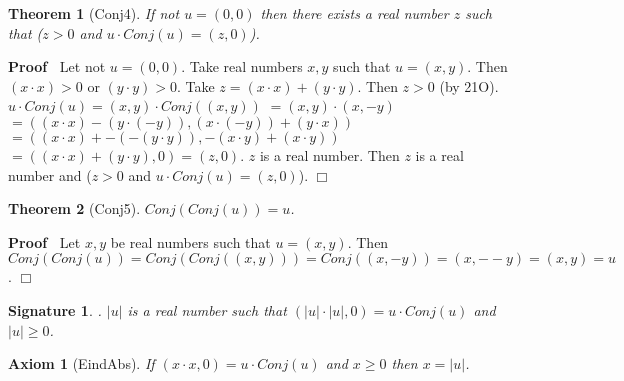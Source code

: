 \documentclass{article}
\newenvironment{forthel}{\begin{leftbar}}{\end{leftbar}}
\newenvironment{proof}{\noindent\textbf{Proof\ }}{\hspace*{\fill}$\Box$\medskip}
\newtheorem{axiom}{Axiom}
\newtheorem{theorem}{Theorem}
\newtheorem{signature}{Signature}
\newcommand{\cmul}{\cdot}
\begin{document}
\begin{forthel}
\begin{theorem}[Conj4] If not $u = (0,0)$ then there exists a real number $z$ such that ($z > 0$ and $u  \cmul  Conj(u) = (z,0)$).
\end{theorem}\begin{proof}
	Let not $u = (0,0)$.\newline
Take real numbers $x,y$ such that $u = (x,y)$.\newline
Then $(x \cdot x) >  0$ or $(y \cdot y) > 0$. Take $z = (x \cdot x) + (y \cdot y)$. \newline
Then $z  >  0$ (by 21O).\newline
$u \cmul Conj(u) = (x,y) \cmul Conj((x,y)) $\newline
$= (x,y) \cmul (x,-y)$ \newline
$= ((x \cdot x) - (y \cdot (-y)) , (x \cdot (-y)) + (y \cdot x)) $\newline
$= ((x \cdot x) + -(-(y \cdot y)) , -(x \cdot y) + (x \cdot y)) $\newline
$= ((x \cdot x) + (y \cdot y), 0) = (z,0)$.\newline
$z$ is a real number.\newline
Then $z$ is a real number and ($z > 0$ and $u \cmul Conj(u) = (z,0)$).\newline
\end{proof}

\begin{theorem}[Conj5] $Conj(Conj(u)) = u$.
\end{theorem}\begin{proof}
 	Let $x,y$ be real numbers such that $u = (x,y)$.\newline
Then $Conj(Conj(u)) = Conj(Conj((x,y))) = Conj((x,-y)) = (x,--y) = (x,y) = u$. \end{proof}

\begin{signature}. $|u|$ is a real number such that $(|u| \cdot |u|,0) = u \cmul Conj(u)$ and $|u|  \geq  0$. \end{signature}
\begin{axiom}[EindAbs] If $(x \cdot x,0) = u \cmul Conj(u)$ and $x  \geq  0$ then $x = |u|$.\end{axiom}


\end{forthel}
\end{document}
